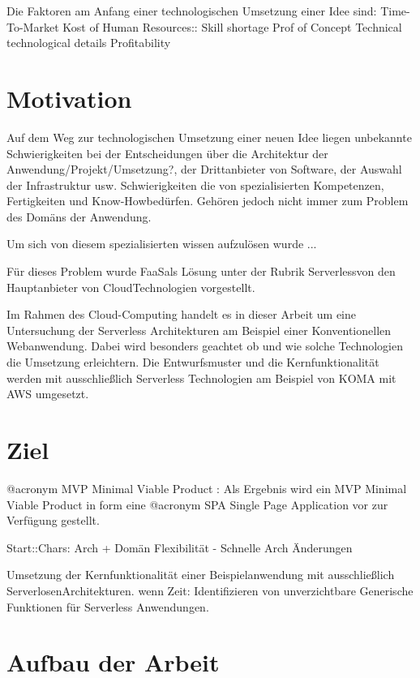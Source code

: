 \documentclass[
12pt,
english,
ngerman,
headsepline,
twoside,
openright,
numbers=noenddot,version=first
]{scrreprt}
\begin{document}
Die Faktoren am Anfang einer technologischen Umsetzung einer Idee sind: 
Time-To-Market
Kost of Human Resources:: Skill shortage
Prof of Concept
Technical technological details
Profitability


\section{Motivation}


Auf dem Weg zur technologischen Umsetzung einer neuen Idee liegen unbekannte Schwierigkeiten
bei der Entscheidungen über die Architektur der Anwendung/Projekt/Umsetzung?,
der Drittanbieter von Software, der Auswahl der Infrastruktur usw.
Schwierigkeiten die von spezialisierten Kompetenzen, Fertigkeiten und \glqq Know-How\grqq bedürfen.
Gehören jedoch nicht immer zum Problem des Domäns der Anwendung.

Um sich von diesem spezialisierten wissen aufzulösen wurde ...

Für dieses Problem wurde \glqq FaaS\grqq als Lösung unter der Rubrik \glqq Serverless\grqq von den Hauptanbieter von \glqq Cloud\grqq Technologien vorgestellt.

Im Rahmen des Cloud-Computing handelt es in dieser Arbeit um eine Untersuchung der Serverless Architekturen am Beispiel einer Konventionellen Webanwendung. Dabei wird besonders geachtet ob und wie solche Technologien die Umsetzung erleichtern. Die Entwurfsmuster und die Kernfunktionalität werden mit ausschließlich Serverless Technologien am Beispiel von KOMA mit AWS umgesetzt.


\section{Ziel}
\label{sec:task}


@acronym MVP Minimal Viable Product : \cite{rady2016serverless}
Als Ergebnis wird ein MVP Minimal Viable Product in form eine @acronym SPA Single Page Application vor zur Verfügung gestellt.

Start::Chars: Arch + Domän Flexibilität - Schnelle Arch Änderungen

Umsetzung der Kernfunktionalität einer Beispielanwendung mit ausschließlich \glqq Serverlosen\grqq Architekturen.
wenn Zeit: Identifizieren von unverzichtbare Generische Funktionen für Serverless Anwendungen.


\section{Aufbau der Arbeit}
\label{sec:layout}
\end{document}
